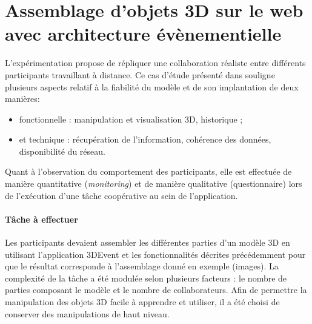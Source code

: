 \section{Assemblage d'objets 3D sur le web avec architecture évènementielle}
\label{sec:us}
L'expérimentation propose de répliquer une collaboration réaliste entre différents 
participants travaillant à distance. Ce cas d'étude présenté dans 
\cite{Desprat2017} souligne plusieurs aspects relatif à la fiabilité du modèle et de 
son implantation de deux manières: 
\begin{itemize}
	\item fonctionnelle : manipulation et visualisation 
	3D, historique ;
	\item et technique : récupération de l'information, cohérence des 
	données, disponibilité du réseau.
\end{itemize}

Quant à l'observation du comportement des participants, elle est 
effectuée de manière quantitative (\textit{monitoring}) et de manière qualitative 
(questionnaire) lors de l'exécution d'une tâche coopérative au sein de l'application.

\paragraph{Tâche à effectuer}
Les participants devaient assembler les différentes parties d'un modèle 3D en 
utilisant l'application 3DEvent et les fonctionnalités décrites précédemment 
 pour que le résultat corresponde à l'assemblage 
donné en exemple (images). La complexité de la tâche a été modulée selon 
plusieurs facteurs : le nombre de parties composant le modèle et le nombre de 
collaborateurs. Afin de permettre la manipulation des objets 3D facile à 
apprendre et utiliser, il a été choisi de conserver des manipulations de haut niveau.

